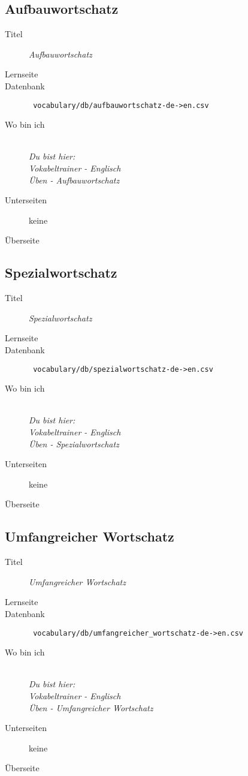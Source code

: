 \subsection{ Aufbauwortschatz }
\label{has:voc-practice-page2}
\begin{description}
	\item[Titel] \emph{ Aufbauwortschatz }
	\item[Lernseite] 
	\item[Datenbank] \texttt{ vocabulary/db/aufbauwortschatz-de->en.csv }
	\item[Wo bin ich] \emph{\\Du bist hier:\\Vokabeltrainer - Englisch\\Üben - Aufbauwortschatz}
	\item[Unterseiten] keine
	\item[Überseite] 
\end{description}

\subsection{ Spezialwortschatz }
\label{has:voc-practice-page3}
\begin{description}
	\item[Titel] \emph{ Spezialwortschatz }
	\item[Lernseite] 
	\item[Datenbank] \texttt{ vocabulary/db/spezialwortschatz-de->en.csv }
	\item[Wo bin ich] \emph{\\Du bist hier:\\Vokabeltrainer - Englisch\\Üben - Spezialwortschatz}
	\item[Unterseiten] keine
	\item[Überseite] 
\end{description}

\subsection{ Umfangreicher Wortschatz }
\label{has:voc-practice-page4}
\begin{description}
	\item[Titel] \emph{ Umfangreicher Wortschatz }
	\item[Lernseite] 
	\item[Datenbank] \texttt{ vocabulary/db/umfangreicher\_wortschatz-de->en.csv }
	\item[Wo bin ich] \emph{\\Du bist hier:\\Vokabeltrainer - Englisch\\Üben - Umfangreicher Wortschatz}
	\item[Unterseiten] keine
	\item[Überseite] 
\end{description}

